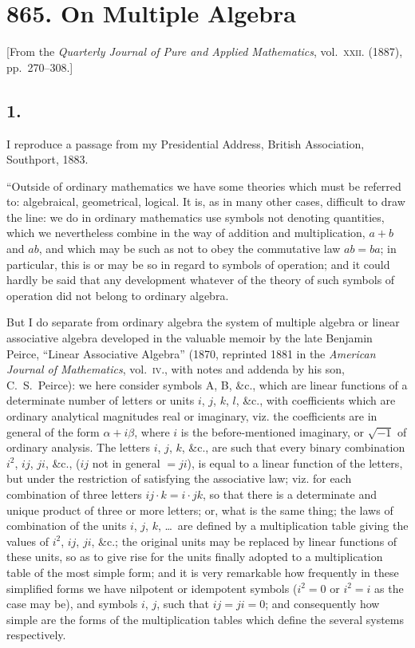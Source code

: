 \documentclass[11pt,a4paper]{book}
\begin{document}
\section*{865. On Multiple Algebra}

\begin{center}
[From the \textit{Quarterly Journal of Pure and Applied Mathematics}, vol.~\textsc{xxii}. (1887), pp.~270--308.]
\end{center}

\subsection*{1.}

I reproduce a passage from my Presidential Address, British Association, Southport, 1883.

``Outside of ordinary mathematics we have some theories which must be referred to: algebraical, geometrical, logical. It is, as in many other cases, difficult to draw the line: we do in ordinary mathematics use symbols not denoting quantities, which we nevertheless combine in the way of addition and multiplication, $a + b$ and $ab$, and which may be such as not to obey the commutative law $ab = ba$; in particular, this is or may be so in regard to symbols of operation; and it could hardly be said that any development whatever of the theory of such symbols of operation did not belong to ordinary algebra.

But I do separate from ordinary algebra the system of multiple algebra or linear associative algebra developed in the valuable memoir by the late Benjamin Peirce, ``Linear Associative Algebra'' (1870, reprinted 1881 in the \textit{American Journal of Mathematics}, vol.~\textsc{iv}., with notes and addenda by his son, C.~S.~Peirce): we here consider symbols A, B, \&c., which are linear functions of a determinate number of letters or units $i$, $j$, $k$, $l$, \&c., with coefficients which are ordinary analytical magnitudes real or imaginary, viz. the coefficients are in general of the form $\alpha + i\beta$, where $i$ is the before-mentioned imaginary, or $\sqrt{-1}$ of ordinary analysis. The letters $i$, $j$, $k$, \&c., are such that every binary combination $i^2$, $ij$, $ji$, \&c., ($ij$ not in general $= ji$), is equal to a linear function of the letters, but under the restriction of satisfying the associative law; viz. for each combination of three letters $ij \cdot k = i \cdot jk$, so that there is a determinate and unique product of three or more letters; or, what is the same thing; the laws of combination of the units $i$, $j$, $k$, \ldots\ are defined by a multiplication table giving the values of $i^2$, $ij$, $ji$, \&c.; the original units may be replaced by linear functions of these units, so as to give rise for the units finally adopted to a multiplication table of the most simple form; and it is very remarkable how frequently in these simplified forms we have nilpotent or idempotent symbols ($i^2 = 0$ or $i^2 = i$ as the case may be), and symbols $i$, $j$, such that $ij = ji = 0$; and consequently how simple are the forms of the multiplication tables which define the several systems respectively.
\end{document}
